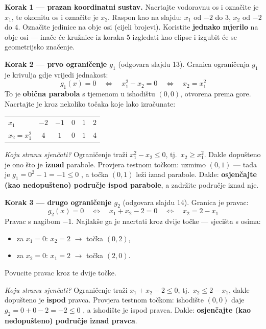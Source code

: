 \begin{crtanje}
\textbf{Korak 1 --- prazan koordinatni sustav.}
Nacrtajte vodoravnu os i označite je $x_1$, te okomitu os i označite je $x_2$.
Raspon kao na slajdu: $x_1$ od $-2$ do $3$, $x_2$ od $-2$ do $4$. Označite
jedinice na obje osi (cijeli brojevi). Koristite \textbf{jednako mjerilo} na
obje osi --- inače će kružnice iz koraka 5 izgledati kao elipse i izgubit će se
geometrijsko značenje.

\medskip
\textbf{Korak 2 --- prvo ograničenje $g_1$} (odgovara slajdu 13).
Granica ograničenja $g_1$ je krivulja gdje vrijedi jednakost:
\[
g_1(x) = 0 \quad \Longleftrightarrow \quad x_1^2 - x_2 = 0
\quad \Longleftrightarrow \quad x_2 = x_1^2
\]
To je \textbf{obična parabola} s tjemenom u ishodištu $(0,0)$, otvorena prema
gore. Nacrtajte je kroz nekoliko točaka koje lako izračunate:

\begin{center}
\begin{tabular}{lccccc}
\toprule
$x_1$ & $-2$ & $-1$ & $0$ & $1$ & $2$ \\
$x_2 = x_1^2$ & $4$ & $1$ & $0$ & $1$ & $4$ \\
\bottomrule
\end{tabular}
\end{center}

\emph{Koju stranu sjenčati?} Ograničenje traži $x_1^2 - x_2 \le 0$, tj.\
$x_2 \ge x_1^2$. Dakle dopušteno je ono što je \textbf{iznad} parabole.
Provjera testnom točkom: uzmimo $(0, 1)$ --- tada je $g_1 = 0^2 - 1 = -1 \le 0$
\checkmark, a točka $(0,1)$ leži iznad parabole. Dakle: \textbf{osjenčajte (kao
nedopušteno) područje ispod parabole}, a zadržite područje iznad nje.

\medskip
\textbf{Korak 3 --- drugo ograničenje $g_2$} (odgovara slajdu 14).
Granica je pravac:
\[
g_2(x) = 0 \quad \Longleftrightarrow \quad x_1 + x_2 - 2 = 0
\quad \Longleftrightarrow \quad x_2 = 2 - x_1
\]
Pravac s nagibom $-1$. Najlakše ga je nacrtati kroz dvije točke --- sjecišta s
osima:
\begin{itemize}
  \item za $x_1 = 0$: $x_2 = 2$ $\to$ točka $(0, 2)$,
  \item za $x_2 = 0$: $x_1 = 2$ $\to$ točka $(2, 0)$.
\end{itemize}
Povucite pravac kroz te dvije točke.

\emph{Koju stranu sjenčati?} Ograničenje traži $x_1 + x_2 - 2 \le 0$, tj.\
$x_2 \le 2 - x_1$, dakle dopušteno je \textbf{ispod} pravca. Provjera testnom
točkom: ishodište $(0,0)$ daje $g_2 = 0 + 0 - 2 = -2 \le 0$ \checkmark, a
ishodište je ispod pravca. Dakle: \textbf{osjenčajte (kao nedopušteno)
područje iznad pravca}.


\end{crtanje}
